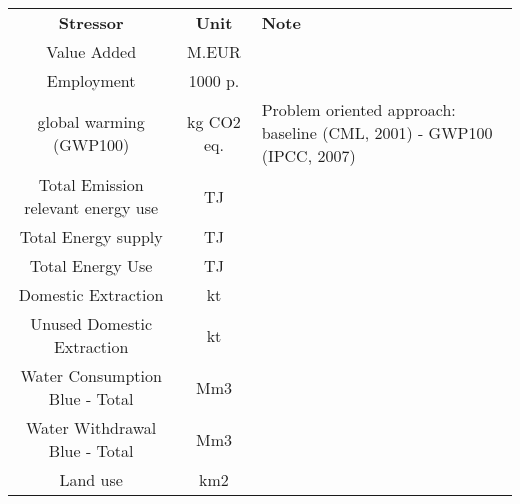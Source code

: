 \begin{table}
\label{tab:cc_stressors}
\begin{tabular}{ c c l }
\textbf{Stressor}                                                                                    & \textbf{Unit } & \textbf{Note}\\
Value Added                                                                                          & M.EUR          &                                                 & \\
Employment                                                                                           & 1000 p.        &                                                 & \\
global warming (GWP100)                                                                              & kg CO2 eq.     & Problem oriented approach: baseline (CML, 2001) - GWP100 (IPCC, 2007)\\
Total Emission relevant energy use                                                                   & TJ             &                                                 & \\
Total Energy supply                                                                                  & TJ             &                                                 & \\
Total Energy Use                                                                                     & TJ             &                                                 & \\
Domestic Extraction                                                                                  & kt             &                                                 & \\
Unused Domestic Extraction                                                                           & kt             &                                                 & \\
Water Consumption Blue - Total                                                                       & Mm3            &                                                 & \\
Water Withdrawal Blue - Total                                                                        & Mm3            &                                                 & \\
Land use                                                                                             & km2            &                                                 & \\

\end{tabular}
\end{table}
